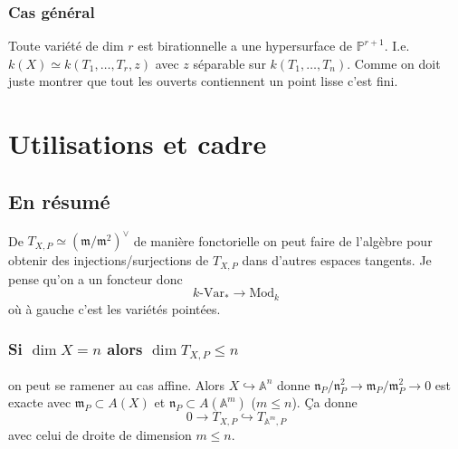 \documentclass[a4paper,12pt]{book}
\newcommand{\A}{\mathbb{A}}
\newcommand{\m}{\mathfrak{m}}
\newcommand{\n}{\mathfrak{n}}
\renewcommand{\Pr}{\mathbb{P}}
\theoremstyle{plain}
\theoremstyle{definition}
\theoremstyle{remark}
\begin{document}
\subsection{Cas général}
Toute variété de dim $r$ est birationnelle a une hypersurface
de $\Pr^{r+1}$. I.e. $k(X)\simeq k(T_1,\ldots, T_r, z)$ avec $z$
séparable sur $k(T_1,\ldots, T_n)$. Comme on doit juste montrer
que tout les ouverts contiennent un point lisse c'est fini.

\chapter{Utilisations et cadre}
\section{En résumé}
De $T_{X,P}\simeq (\m/\m^2)^\vee$ de manière fonctorielle on peut
faire de l'algèbre pour obtenir des injections/surjections de 
$T_{X,P}$ dans d'autres espaces tangents. Je pense qu'on a un
foncteur donc 
\[k\textrm{-Var}_*\to \textrm{Mod}_k\]
où à gauche c'est les variétés pointées.

\subsection{Si $\dim X=n$ alors $\dim T_{X,P}\leq n$}
on peut se ramener au cas affine. Alors $X\hookrightarrow \A^n$
donne $\n_P/\n_P^2\to \m_P/\m_P^2\to 0$ est exacte avec
$\m_P\subset A(X)$ et $\n_P\subset A(\A^m)$ ($m\leq n$). Ça donne
\[0\to T_{X,P}\hookrightarrow T_{\A^m,P}\]
avec celui de droite de dimension $m\leq n$.
\end{document}

